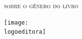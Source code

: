 \documentclass[smaller,professionalfonts,15pt]{beamer}
\begin{document}
\begin{frame}
\hfill\Huge
\textsc{sobre o gênero do livro}
\end{frame}




\begin{frame}
\centering\hfill\texttt{[image: \\logoeditora]}
\end{frame}
\end{document}
